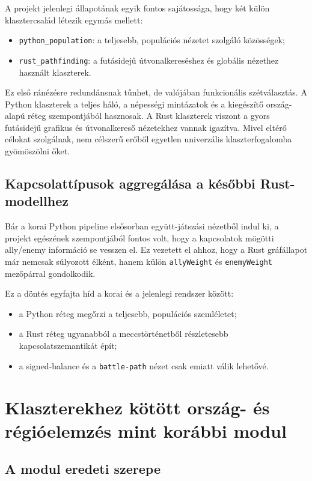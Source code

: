 \documentclass[a4paper,12pt]{report}
\begin{document}
A projekt jelenlegi állapotának egyik fontos sajátossága, hogy két külön klasztercsalád létezik egymás mellett:

\begin{itemize}
    \item \texttt{python\_population}: a teljesebb, populációs nézetet szolgáló közösségek;
    \item \texttt{rust\_pathfinding}: a futásidejű útvonalkereséshez és globális nézethez használt klaszterek.
\end{itemize}

Ez első ránézésre redundánsnak tűnhet, de valójában funkcionális szétválasztás. A Python klaszterek a teljes háló, a népességi mintázatok és a kiegészítő ország-alapú réteg szempontjából hasznosak. A Rust klaszterek viszont a gyors futásidejű grafikus és útvonalkereső nézetekhez vannak igazítva. Mivel eltérő célokat szolgálnak, nem célszerű erőből egyetlen univerzális klaszterfogalomba gyömöszölni őket.

\section{Kapcsolattípusok aggregálása a későbbi Rust-modellhez}

Bár a korai Python pipeline elsősorban együtt-játszási nézetből indul ki, a projekt egészének szempontjából fontos volt, hogy a kapcsolatok mögötti ally/enemy információ se vesszen el. Ez vezetett el ahhoz, hogy a Rust gráfállapot már nemcsak súlyozott élként, hanem külön \texttt{allyWeight} és \texttt{enemyWeight} mezőpárral gondolkodik.

Ez a döntés egyfajta híd a korai és a jelenlegi rendszer között:

\begin{itemize}
    \item a Python réteg megőrzi a teljesebb, populációs szemléletet;
    \item a Rust réteg ugyanabból a meccstörténetből részletesebb kapcsolatszemantikát épít;
    \item a signed-balance és a \texttt{battle-path} nézet csak emiatt válik lehetővé.
\end{itemize}

\chapter{Klaszterekhez kötött ország- és régióelemzés mint korábbi modul}

\section{A modul eredeti szerepe}
\end{document}
